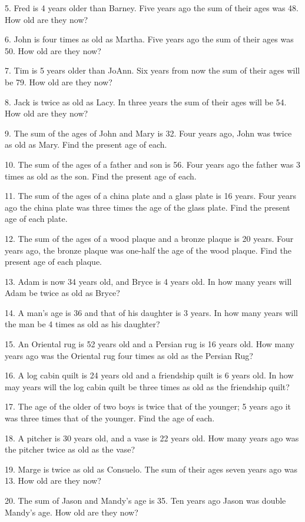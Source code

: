 5. Fred is 4 years older than Barney. Five years ago the sum of their ages was
48. How old are they now?

6. John is four times as old as Martha. Five years ago the sum of their ages
was 50. How old are they now?

7. Tim is 5 years older than JoAnn. Six years from now the sum of their ages
will be 79. How old are they now?

8. Jack is twice as old as Lacy. In three years the sum of their ages will be
54. How old are they now?

9. The sum of the ages of John and Mary is 32. Four years ago, John was twice
as old as Mary. Find the present age of each.

10. The sum of the ages of a father and son is 56. Four years ago the father
was 3 times as old as the son. Find the present age of each.

11. The sum of the ages of a china plate and a glass plate is 16 years. Four
years ago the china plate was three times the age of the glass
plate. Find the present age of each plate.

12. The sum of the ages of a wood plaque and a bronze plaque is 20 years. Four
years ago, the bronze plaque was one-half the age of the wood
plaque. Find the present age of each plaque.

13. Adam is now 34 years old, and Bryce is 4 years old. In how many years will Adam be twice as old as Bryce?

14. A man's age is 36 and that of his daughter is 3 years. In how many years
will the man be 4 times as old as his daughter?

15. An Oriental rug is 52 years old and a Persian rug is 16 years old. How
many years ago was the Oriental rug four times as old as the
Persian Rug?

16. A log cabin quilt is 24 years old and a friendship quilt is 6 years old.
In how may years will the log cabin quilt be three times as old
as the friendship quilt?

17. The age of the older of two boys is twice that of the younger; 5 years ago
it was three times that of the younger. Find the age of
each.

18. A pitcher is 30 years old, and a vase is 22 years old. How many years ago
was the pitcher twice as old as the vase?

19. Marge is twice as old as Consuelo. The sum of their ages seven years ago
was 13. How old are they now?

20. The sum of Jason and Mandy's age is 35. Ten years ago Jason was double Mandy's age. How old are they now?

